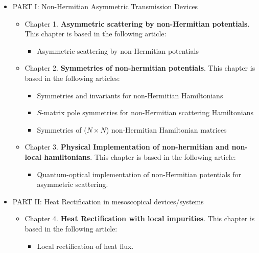 \begin{itemize}
  \item PART I: Non-Hermitian Asymmetric Transmission Devices

    \begin{itemize}
      \item Chapter 1. \textbf{Asymmetric scattering by non-Hermitian potentials}.
      This chapter is based in the following article:

      \begin{itemize}
        \item Asymmetric scattering by non-Hermitian potentials
      \end{itemize}

      \item Chapter 2. \textbf{Symmetries of non-hermitian potentials}.
      This chapter is based in the following articles:

      \begin{itemize}
        \item Symmetries and invariants for non-Hermitian Hamiltonians
        \item $S$-matrix pole symmetries for non-Hermitian scattering Hamiltonians
        \item Symmetries of ($N \times N$) non-Hermitian Hamiltonian matrices
      \end{itemize}

      \item Chapter 3. \textbf{Physical Implementation of non-hermitian and non-local hamiltonians}.
      This chapter is based in the following article:

      \begin{itemize}
        \item Quantum-optical implementation of non-Hermitian potentials for asymmetric scattering.
      \end{itemize}

    \end{itemize}

  \item PART II: Heat Rectification in mesoscopical devices/systems

    \begin{itemize}
      \item Chapter 4. \textbf{Heat Rectification with local impurities}.
      This chapter is based in the following article:

      \begin{itemize}
        \item Local rectification of heat flux.
      \end{itemize}


\end{itemize}
\end{itemize}
